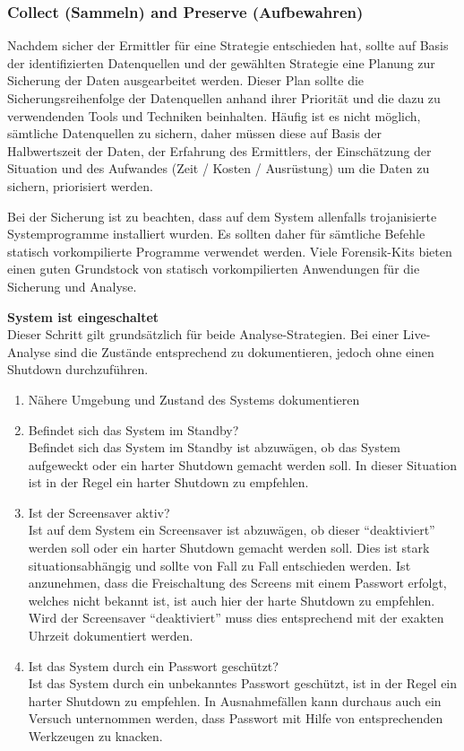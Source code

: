 \subsubsection{Collect (Sammeln) and Preserve (Aufbewahren)} \label{subsubsec:FA:Secure:CollectPreserve}
Nachdem sicher der Ermittler für eine Strategie entschieden hat, sollte auf Basis der identifizierten Datenquellen und der gewählten Strategie eine Planung zur Sicherung der Daten ausgearbeitet werden. Dieser Plan sollte die Sicherungsreihenfolge der Datenquellen anhand ihrer Priorität und die dazu zu verwendenden Tools und Techniken beinhalten. Häufig ist es nicht möglich, sämtliche Datenquellen zu sichern, daher müssen diese auf Basis der Halbwertszeit der Daten, der Erfahrung des Ermittlers, der Einschätzung der Situation und des Aufwandes (Zeit / Kosten / Ausrüstung) um die Daten zu sichern,  priorisiert werden.

Bei der Sicherung ist zu beachten, dass auf dem System allenfalls trojanisierte Systemprogramme installiert wurden. Es sollten daher für sämtliche Befehle statisch vorkompilierte  Programme verwendet werden. Viele Forensik-Kits bieten einen guten Grundstock von statisch vorkompilierten Anwendungen für die Sicherung und Analyse.

\textbf{System ist eingeschaltet}\\
Dieser Schritt gilt grundsätzlich für beide Analyse-Strategien. Bei einer Live-Analyse sind die Zustände entsprechend zu dokumentieren, jedoch ohne einen Shutdown durchzuführen. 

\begin{enumerate}
\item Nähere Umgebung und Zustand des Systems dokumentieren
\item Befindet sich das System im Standby? \\
Befindet sich das System im Standby ist abzuwägen, ob das System aufgeweckt oder ein harter Shutdown gemacht werden soll. In dieser Situation ist in der Regel ein harter Shutdown  zu empfehlen.
\item Ist der Screensaver aktiv? \\
Ist auf dem System ein Screensaver ist abzuwägen, ob dieser "`deaktiviert"' werden soll oder ein harter Shutdown gemacht werden soll. Dies ist stark situationsabhängig und sollte von Fall zu Fall entschieden werden. Ist anzunehmen, dass die Freischaltung des Screens mit einem Passwort erfolgt, welches nicht bekannt ist, ist auch hier der harte Shutdown zu empfehlen. Wird der Screensaver "`deaktiviert"' muss dies entsprechend mit der exakten Uhrzeit dokumentiert werden.
\item Ist das System durch ein Passwort geschützt? \\
Ist das System durch ein unbekanntes Passwort geschützt, ist in der Regel ein harter Shutdown zu empfehlen. In Ausnahmefällen kann durchaus auch ein Versuch unternommen werden, dass Passwort mit Hilfe von entsprechenden Werkzeugen zu knacken.
\end{enumerate}

